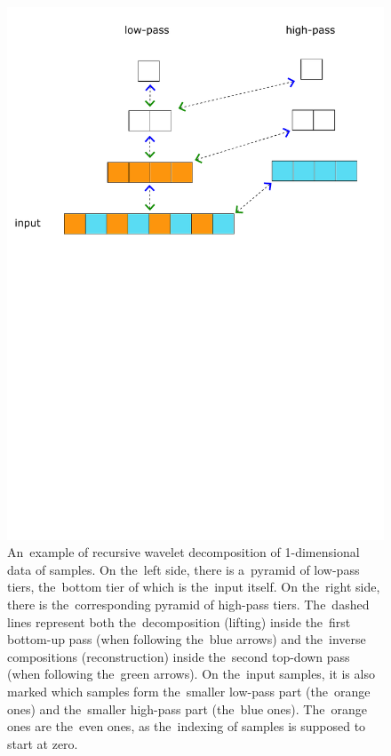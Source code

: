 \begin{figure}
	\includegraphics[trim={0 16cm 0 0}, clip, width=\textwidth]{figures/wavelet_1d_pyramid.pdf}\centering
	\caption{An~example of recursive wavelet decomposition of 1-dimensional data of samples. On the~left side, there is a~pyramid of low-pass tiers, the~bottom tier of which is the~input itself. On the~right side, there is the~corresponding pyramid of high-pass tiers. The~dashed lines represent both the~decomposition (lifting) inside the~first bottom-up pass (when following the~blue arrows) and the~inverse compositions (reconstruction) inside the~second top-down pass (when following the~green arrows). On the~input samples, it is also marked which samples form the~smaller low-pass part (the~orange ones) and the~smaller high-pass part (the~blue ones). The~orange ones are the~even ones, as the~indexing of samples is supposed to start at zero.}
	\label{fig:wavelet_1d_pyramid}
\end{figure}

